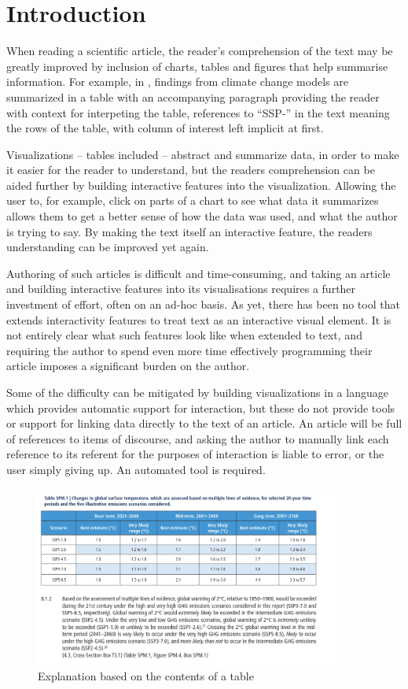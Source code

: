 \section{Introduction}

When reading a scientific article, the reader's comprehension of the text may
be greatly improved by inclusion of charts, tables and figures that help summarise information.
For example, in , findings from climate change models
are summarized in a table with an accompanying paragraph providing the reader
with context for interpeting the table, references to ``SSP-'' in the text meaning
the rows of the table, with column of interest left implicit at first.

Visualizations -- tables included -- abstract and summarize data, in order to make
it easier for the reader to understand, but the readers comprehension can be aided
further by building interactive features into the visualization. Allowing the user
to, for example, click on parts of a chart to see what data it summarizes allows
them to get a better sense of how the data was used, and what the author is trying
to say. By making the text itself an interactive feature, the readers understanding
can be improved yet again.

Authoring of such articles is difficult and time-consuming, and taking an article
and building interactive features into its visualisations requires a further investment
of effort, often on an ad-hoc basis. As yet, there has been no tool that extends
interactivity features to treat text as an interactive visual element. It is not
entirely clear what such features look like when extended to text, and requiring
the author to spend even more time effectively programming their article imposes
a significant burden on the author. 

Some of the difficulty can be mitigated by building visualizations in a language
which provides automatic support for interaction, but these do not provide tools
or support for linking data directly to the text of an article. An article will
be full of references to items of discourse, and asking the author to manually
link each reference to its referent for the purposes of interaction is liable to
error, or the user simply giving up. An automated tool is required. 

\begin{figure}
   \includegraphics[width=0.9\textwidth]{fig/ipcc-table-explanation.png}
   \caption{Explanation based on the contents of a table}
   \label{fig:table-explanation}
\end{figure}